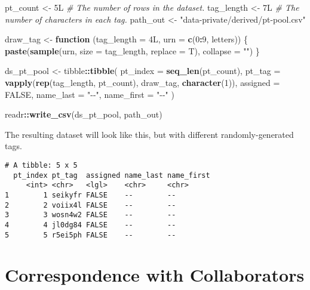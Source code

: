 \documentclass[
]{book}
\newenvironment{Shaded}{\begin{snugshade}}{\end{snugshade}}
\newcommand{\CommentTok}[1]{\textcolor[rgb]{0.56,0.35,0.01}{\textit{#1}}}
\newcommand{\ControlFlowTok}[1]{\textcolor[rgb]{0.13,0.29,0.53}{\textbf{#1}}}
\newcommand{\DataTypeTok}[1]{\textcolor[rgb]{0.13,0.29,0.53}{#1}}
\newcommand{\DecValTok}[1]{\textcolor[rgb]{0.00,0.00,0.81}{#1}}
\newcommand{\KeywordTok}[1]{\textcolor[rgb]{0.13,0.29,0.53}{\textbf{#1}}}
\newcommand{\NormalTok}[1]{#1}
\newcommand{\OperatorTok}[1]{\textcolor[rgb]{0.81,0.36,0.00}{\textbf{#1}}}
\newcommand{\OtherTok}[1]{\textcolor[rgb]{0.56,0.35,0.01}{#1}}
\newcommand{\StringTok}[1]{\textcolor[rgb]{0.31,0.60,0.02}{#1}}
\begin{document}
\begin{Shaded}
\begin{Highlighting}[]
\NormalTok{pt\_count    <{-}}\StringTok{ }\NormalTok{5L   }\CommentTok{\# The number of rows in the dataset.}
\NormalTok{tag\_length  <{-}}\StringTok{ }\NormalTok{7L   }\CommentTok{\# The number of characters in each tag.}
\NormalTok{path\_out    <{-}}\StringTok{ "data{-}private/derived/pt{-}pool.csv"}

\NormalTok{draw\_tag <{-}}\StringTok{ }\ControlFlowTok{function}\NormalTok{ (}\DataTypeTok{tag\_length =}\NormalTok{ 4L, }\DataTypeTok{urn =} \KeywordTok{c}\NormalTok{(}\DecValTok{0}\OperatorTok{:}\DecValTok{9}\NormalTok{, letters)) \{}
  \KeywordTok{paste}\NormalTok{(}\KeywordTok{sample}\NormalTok{(urn, }\DataTypeTok{size =}\NormalTok{ tag\_length, }\DataTypeTok{replace =}\NormalTok{ T), }\DataTypeTok{collapse =} \StringTok{""}\NormalTok{)}
\NormalTok{\}}

\NormalTok{ds\_pt\_pool <{-}}\StringTok{ }
\StringTok{  }\NormalTok{tibble}\OperatorTok{::}\KeywordTok{tibble}\NormalTok{(}
    \DataTypeTok{pt\_index    =} \KeywordTok{seq\_len}\NormalTok{(pt\_count),}
    \DataTypeTok{pt\_tag      =} \KeywordTok{vapply}\NormalTok{(}\KeywordTok{rep}\NormalTok{(tag\_length, pt\_count), draw\_tag, }\KeywordTok{character}\NormalTok{(}\DecValTok{1}\NormalTok{)),}
    \DataTypeTok{assigned    =} \OtherTok{FALSE}\NormalTok{,}
    \DataTypeTok{name\_last   =} \StringTok{"{-}{-}"}\NormalTok{,}
    \DataTypeTok{name\_first  =} \StringTok{"{-}{-}"}
\NormalTok{  )}

\NormalTok{readr}\OperatorTok{::}\KeywordTok{write\_csv}\NormalTok{(ds\_pt\_pool, path\_out)}
\end{Highlighting}
\end{Shaded}

The resulting dataset will look like this, but with different randomly-generated tags.

\begin{verbatim}
# A tibble: 5 x 5
  pt_index pt_tag  assigned name_last name_first
     <int> <chr>   <lgl>    <chr>     <chr>     
1        1 seikyfr FALSE    --        --        
2        2 voiix4l FALSE    --        --        
3        3 wosn4w2 FALSE    --        --        
4        4 jl0dg84 FALSE    --        --        
5        5 r5ei5ph FALSE    --        --        
\end{verbatim}

\hypertarget{snippets-correspondence}{%
\section{Correspondence with Collaborators}\label{snippets-correspondence}}
\end{document}

